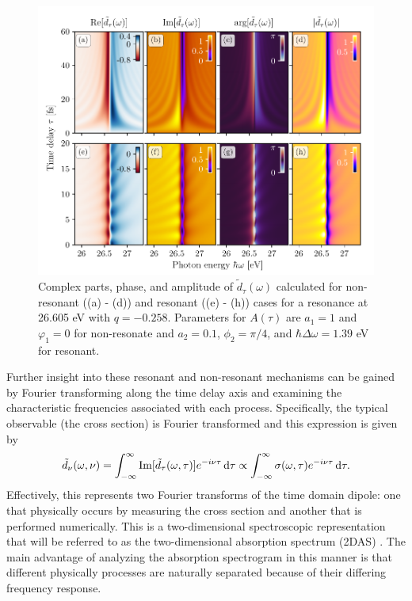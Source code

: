 \begin{figure}
	\centering
	\includegraphics[width=1.0\textwidth]{figures/ATS/dipole_components.pdf}
	\caption[Complex parts, phase, and amplitude of $\tilde{d}_\tau(\omega)$ calculated for resonant and non-resonant interactions]{Complex parts, phase, and amplitude of $\tilde{d}_\tau(\omega)$ calculated for non-resonant ((a) - (d)) and resonant ((e) - (h)) cases for a resonance at 26.605 eV with $q=-0.258$. Parameters for $A(\tau)$ are $a_1=1$ and $\varphi_1=0$ for non-resonate and $a_2=0.1$, $\phi_2=\pi/4$, and $\hbar\Delta\omega=1.39$ eV for resonant.}
	\label{fig:dip_components}
\end{figure}

Further insight into these resonant and non-resonant mechanisms can be gained by Fourier transforming along the time delay axis and examining the characteristic frequencies associated with each process.  Specifically, the typical observable (the cross section) is Fourier transformed and this expression is given by
\begin{equation}
\label{eqn:2DAS_fourier_transform}
	\tilde{d}_\nu(\omega, \nu)=\int_{-\infty}^{\infty}\mathrm{Im}[\tilde{d}_\tau(\omega, \tau)]e^{-i\nu\tau}\mathop{}\!\mathrm{d}\tau\propto\int_{-\infty}^{\infty}\sigma(\omega, \tau)e^{-i\nu\tau}\mathop{}\!\mathrm{d}\tau.
\end{equation}  
Effectively, this represents two Fourier transforms of the time domain dipole: one that physically occurs by measuring the cross section and another that is performed numerically.  This is a two-dimensional spectroscopic representation that will be referred to as the two-dimensional absorption spectrum (2DAS) \cite{blattermannTwodimensionalSpectralInterpretation2014, blattermannImpulsiveControlAtomic2016}. The main advantage of analyzing the absorption spectrogram in this manner is that different physically processes are naturally separated because of their differing frequency response.

